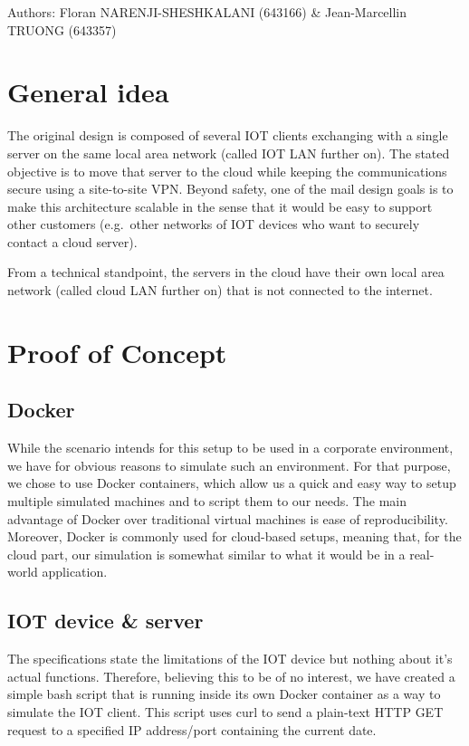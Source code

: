 \documentclass[paper=a4, fontsize=11pt]{scrartcl}
\author{Floran NARENJI-SHESHKALANI \& Jean-Marcellin TRUONG}
\begin{document}
Authors: Floran NARENJI-SHESHKALANI (643166) \& Jean-Marcellin TRUONG (643357)

\section{General idea}

The original design is composed of several IOT clients exchanging with a single
server on the same local area network (called IOT LAN further on).
The stated objective is to move that server to the cloud while keeping the
communications secure using a site-to-site VPN\@.
Beyond safety, one of the mail design goals is to make this architecture
scalable in the sense that it would be easy to support other customers (e.g.\
other networks of IOT devices who want to securely contact a cloud server).

From a technical standpoint, the servers in the cloud have their own local area
network (called cloud LAN further on) that is not connected to the internet.

\section{Proof of Concept}

\subsection{Docker}

While the scenario intends for this setup to be used in a corporate environment,
we have for obvious reasons to simulate such an environment.
For that purpose, we chose to use Docker containers, which allow us a quick and
easy way to setup multiple simulated machines and to script them to our needs.
The main advantage of Docker over traditional virtual machines is ease of
reproducibility.
Moreover, Docker is commonly used for cloud-based setups, meaning that, for the
cloud part, our simulation is somewhat similar to what it would be in a
real-world application.

\subsection{IOT device \& server}

The specifications state the limitations of the IOT device but nothing about
it's actual functions.
Therefore, believing this to be of no interest, we have created a simple bash
script that is running inside its own Docker container as a way to simulate the
IOT client.
This script uses curl to send a plain-text HTTP GET request to a specified IP
address/port containing the current date.
\end{document}
